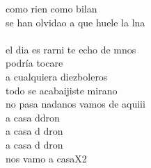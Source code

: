 \begin{cancion}[Sirenas][Taburete]
	como rien como bilan\\
	se han olvidao a que huele la lna\\
	\jump\\
	el dia es rarni te echo de mnos\\
	podría tocare \\
	a cualquiera diezboleros\\
	todo se acabaijiste mirano\\
	no pasa nadanos vamos de aquiii\\
	a casa ddron\\
	a casa d dron\\
	a casa d dron\\
	nos vamo a casaX2\\
\end{cancion}%
